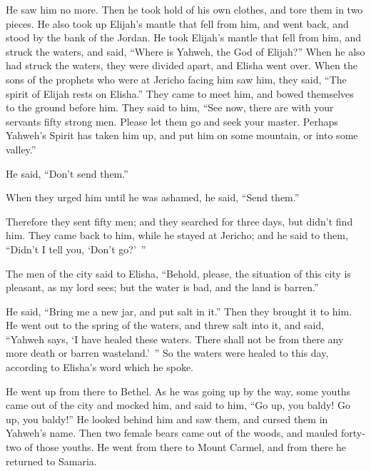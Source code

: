 {\par }{\PP He saw him no more. Then he took hold of his own clothes, and tore them in two pieces.
He also took up Elijah’s mantle that fell from him, and went back, and stood by the bank of the Jordan.
He took Elijah’s mantle that fell from him, and struck the waters, and said, “Where is Yahweh, the God of Elijah?” When he also had struck the waters, they were divided apart, and Elisha went over.
When the sons of the prophets who were at Jericho facing him saw him, they said, “The spirit of Elijah rests on Elisha.” They came to meet him, and bowed themselves to the ground before him.
They said to him, “See now, there are with your servants fifty strong men. Please let them go and seek your master. Perhaps Yahweh’s Spirit has taken him up, and put him on some mountain, or into some valley.”
\par }{\PP He said, “Don’t send them.”
\par }{\PP {}When they urged him until he was ashamed, he said, “Send them.”
\par }{\PP Therefore they sent fifty men; and they searched for three days, but didn’t find him.
They came back to him, while he stayed at Jericho; and he said to them, “Didn’t I tell you, ‘Don’t go?’ ”
\par }{\PP {}The men of the city said to Elisha, “Behold, please, the situation of this city is pleasant, as my lord sees; but the water is bad, and the land is barren.”
\par }{\PP {}He said, “Bring me a new jar, and put salt in it.” Then they brought it to him.
He went out to the spring of the waters, and threw salt into it, and said, “Yahweh says, ‘I have healed these waters. There shall not be from there any more death or barren wasteland.’ ”
So the waters were healed to this day, according to Elisha’s word which he spoke.
\par }{\PP {}He went up from there to Bethel. As he was going up by the way, some youths came out of the city and mocked him, and said to him, “Go up, you baldy! Go up, you baldy!”
He looked behind him and saw them, and cursed them in Yahweh’s name. Then two female bears came out of the woods, and mauled forty-two of those youths.
He went from there to Mount Carmel, and from there he returned to Samaria.

}
